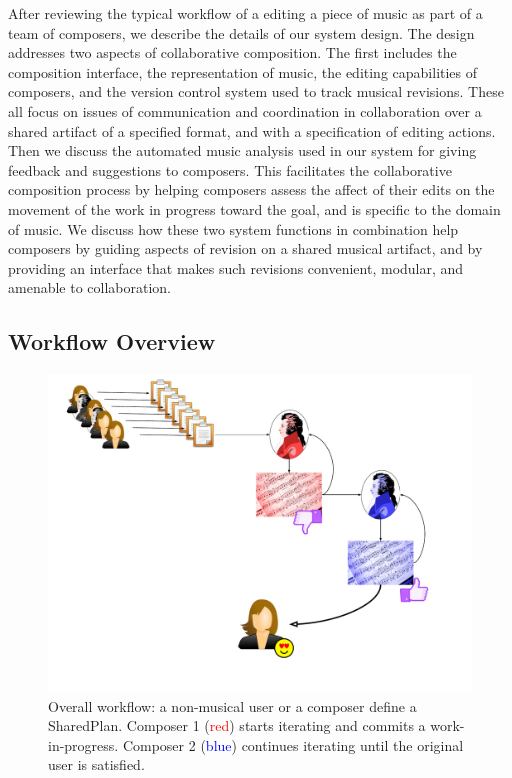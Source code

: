 \documentclass[final,authoryear,5p,times,twocolumn]{elsarticle}
\begin{document}
After reviewing the typical workflow of a editing a piece of music as part of a team of composers, we describe the details of our system design. The design addresses two aspects of collaborative composition. The first includes the composition interface, the representation of music, the editing capabilities of composers, and the version control system used to track musical revisions. These all focus on issues of communication and coordination in collaboration over a shared artifact of a specified format, and with a specification of editing actions. Then we discuss the automated music analysis used in our system for giving feedback and suggestions to composers. This facilitates the collaborative composition process by helping composers assess the affect of their edits on the movement of the work in progress toward the goal, and is specific to the domain of music. We discuss how these two system functions in combination help composers by guiding aspects of revision on a shared musical artifact, and by providing an interface that makes such revisions convenient, modular, and amenable to collaboration.

\subsection{Workflow Overview}

\begin{figure}
	\includegraphics[scale=0.35]{workflow.pdf}
	\caption{Overall workflow: a non-musical user or a composer define a SharedPlan. Composer 1 (\textcolor{red}{red}) starts
	iterating and commits a work-in-progress. Composer 2 (\textcolor{blue}{blue}) continues iterating until the original user is
	satisfied.}
	\label{fig:workflow}
\end{figure}
\end{document}
